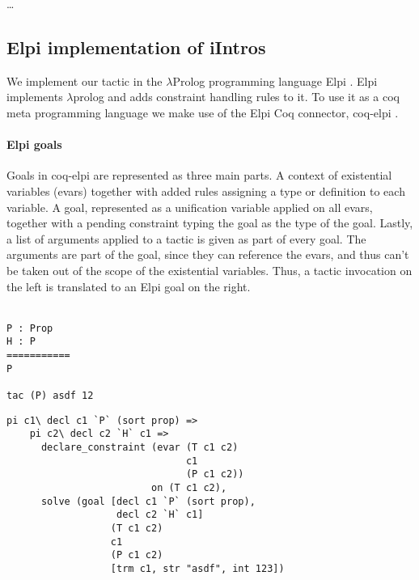 \documentclass[thesis.tex]{subfiles}
\begin{document}
\dots

\subsection{Elpi implementation of iIntros}
We implement our tactic in the $\lambda$Prolog programming language Elpi \cite{dunchevELPIFastEmbeddable2015}. Elpi implements $\lambda$prolog and adds constraint handling rules to it. To use it as a coq meta programming language we make use of the Elpi Coq connector, coq-elpi \cite{tassiElpiExtensionLanguage2018}.

\paragraph*{Elpi goals}
Goals in coq-elpi are represented as three main parts. A context of existential variables (evars) together with added rules assigning a type or definition to each variable. A goal, represented as a unification variable applied on all evars, together with a pending constraint typing the goal as the type of the goal. Lastly, a list of arguments applied to a tactic is given as part of every goal. The arguments are part of the goal, since they can reference the evars, and thus can't be taken out of the scope of the existential variables. Thus, a tactic invocation on the left is translated to an Elpi goal on the right.
\\\\
\begin{minipage}[t]{0.2\linewidth}
  \begin{verbatim}
P : Prop
H : P
===========
P

tac (P) asdf 12
\end{verbatim}
\end{minipage}
\begin{minipage}[t]{0.45\linewidth}
  \begin{verbatim}
pi c1\ decl c1 `P` (sort prop) =>
    pi c2\ decl c2 `H` c1 =>
      declare_constraint (evar (T c1 c2) 
                               c1
                               (P c1 c2)) 
                         on (T c1 c2),
      solve (goal [decl c1 `P` (sort prop), 
                   decl c2 `H` c1] 
                  (T c1 c2)
                  c1 
                  (P c1 c2)
                  [trm c1, str "asdf", int 123])
\end{verbatim}
  \vspace{.1cm}
\end{minipage}
\end{document}
